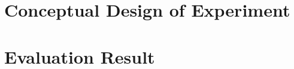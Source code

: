 \chapter{Conceptual Design of Experiment}
\label{chapter:conept}
\thispagestyle{myheadings}

\graphicspath{{3_Body/Figures/}}

\clearpage



\chapter{Evaluation Result}
\label{chapter:evaluation}
\thispagestyle{myheadings}

\clearpage
